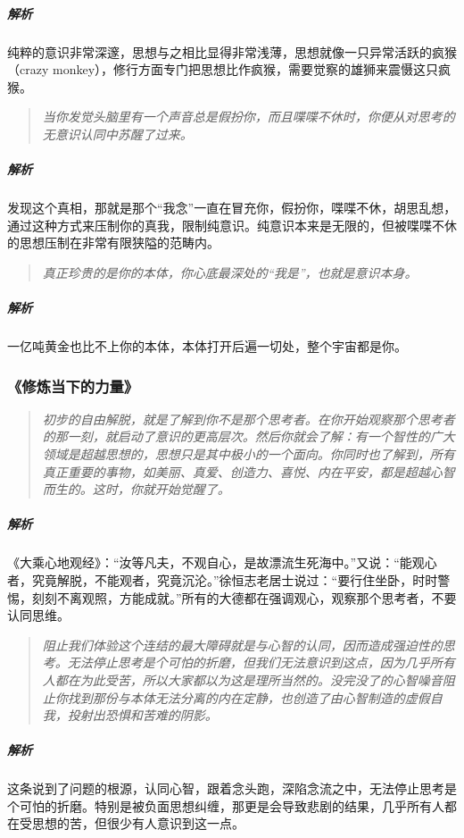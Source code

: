 \subparagraph{解析} 纯粹的意识非常深邃，思想与之相比显得非常浅薄，思想就像一只异常活跃的疯猴（crazy monkey），修行方面专门把思想比作疯猴，需要觉察的雄狮来震慑这只疯猴。

\begin{quote}\it
    当你发觉头脑里有一个声音总是假扮你，而且喋喋不休时，你便从对思考的无意识认同中苏醒了过来。
\end{quote}

\subparagraph{解析} 发现这个真相，那就是那个“我念”一直在冒充你，假扮你，喋喋不休，胡思乱想，通过这种方式来压制你的真我，限制纯意识。纯意识本来是无限的，但被喋喋不休的思想压制在非常有限狭隘的范畴内。

\begin{quote}\it
    真正珍贵的是你的本体，你心底最深处的“我是”，也就是意识本身。
\end{quote}

\subparagraph{解析} 一亿吨黄金也比不上你的本体，本体打开后遍一切处，整个宇宙都是你。

\subsubsection{《修炼当下的力量》}

\begin{quote}\it
    初步的自由解脱，就是了解到你不是那个思考者。在你开始观察那个思考者的那一刻，就启动了意识的更高层次。然后你就会了解：有一个智性的广大领域是超越思想的，思想只是其中极小的一个面向。你同时也了解到，所有真正重要的事物，如美丽、真爱、创造力、喜悦、内在平安，都是超越心智而生的。这时，你就开始觉醒了。
\end{quote}

\subparagraph{解析} 《大乘心地观经》：“汝等凡夫，不观自心，是故漂流生死海中。”又说：“能观心者，究竟解脱，不能观者，究竟沉沦。”徐恒志老居士说过：“要行住坐卧，时时警惕，刻刻不离观照，方能成就。”所有的大德都在强调观心，观察那个思考者，不要认同思维。

\begin{quote}\it
    阻止我们体验这个连结的最大障碍就是与心智的认同，因而造成强迫性的思考。无法停止思考是个可怕的折磨，但我们无法意识到这点，因为几乎所有人都在为此受苦，所以大家都以为这是理所当然的。没完没了的心智噪音阻止你找到那份与本体无法分离的内在定静，也创造了由心智制造的虚假自我，投射出恐惧和苦难的阴影。
\end{quote}

\subparagraph{解析} 这条说到了问题的根源，认同心智，跟着念头跑，深陷念流之中，无法停止思考是个可怕的折磨。特别是被负面思想纠缠，那更是会导致悲剧的结果，几乎所有人都在受思想的苦，但很少有人意识到这一点。

